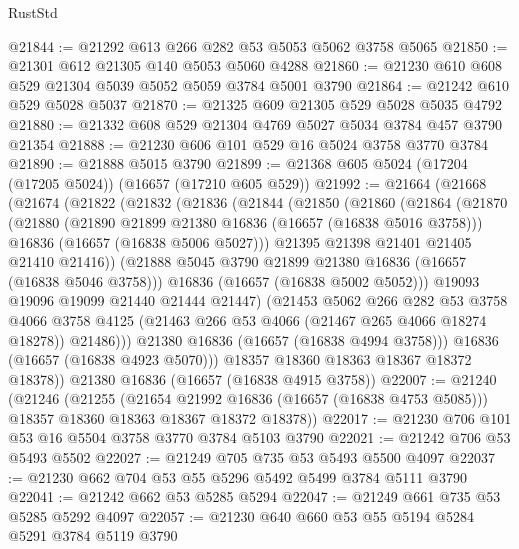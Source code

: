 \begin{lexlean}{RustStd}
\begin{coremodule}
@21844 := @21292 @613 @266 @282 @53 @5053 @5062 @3758 @5065
@21850 := @21301 @612 @21305 @140 @5053 @5060 @4288
@21860 := @21230 @610 @608 @529 @21304 @5039 @5052 @5059 @3784 @5001 @3790
@21864 := @21242 @610 @529 @5028 @5037
@21870 := @21325 @609 @21305 @529 @5028 @5035 @4792
@21880 := @21332 @608 @529 @21304 @4769 @5027 @5034 @3784 @457 @3790 @21354
@21888 := @21230 @606 @101 @529 @16 @5024 @3758 @3770 @3784
@21890 := @21888 @5015 @3790
@21899 := @21368 @605 @5024 (@17204 (@17205 @5024)) (@16657 (@17210 @605 @529))
@21992 := @21664
    (@21668
      (@21674
        (@21822
          (@21832
            (@21836
              (@21844
                (@21850
                  (@21860
                    (@21864
                      (@21870
                        (@21880
                          (@21890 @21899 @21380 @16836 (@16657 (@16838 @5016 @3758)))
                          @16836
                          (@16657 (@16838 @5006 @5027)))
                        @21395
                        @21398
                        @21401
                        @21405
                        @21410
                        @21416))
                    (@21888 @5045 @3790 @21899 @21380 @16836 (@16657 (@16838 @5046 @3758)))
                    @16836
                    (@16657 (@16838 @5002 @5052)))
                  @19093
                  @19096
                  @19099
                  @21440
                  @21444
                  @21447)
                (@21453
                  @5062
                  @266
                  @282
                  @53
                  @3758
                  @4066
                  @3758
                  @4125
                  (@21463 @266 @53 @4066 (@21467 @265 @4066 @18274 @18278))
                  @21486)))
            @21380
            @16836
            (@16657 (@16838 @4994 @3758)))
          @16836
          (@16657 (@16838 @4923 @5070)))
        @18357
        @18360
        @18363
        @18367
        @18372
        @18378))
    @21380
    @16836
    (@16657 (@16838 @4915 @3758))
@22007 := @21240
    (@21246
      (@21255
        (@21654 @21992 @16836 (@16657 (@16838 @4753 @5085)))
        @18357
        @18360
        @18363
        @18367
        @18372
        @18378))
@22017 := @21230 @706 @101 @53 @16 @5504 @3758 @3770 @3784 @5103 @3790
@22021 := @21242 @706 @53 @5493 @5502
@22027 := @21249 @705 @735 @53 @5493 @5500 @4097
@22037 := @21230 @662 @704 @53 @55 @5296 @5492 @5499 @3784 @5111 @3790
@22041 := @21242 @662 @53 @5285 @5294
@22047 := @21249 @661 @735 @53 @5285 @5292 @4097
@22057 := @21230 @640 @660 @53 @55 @5194 @5284 @5291 @3784 @5119 @3790

\end{coremodule}
\end{lexlean}
